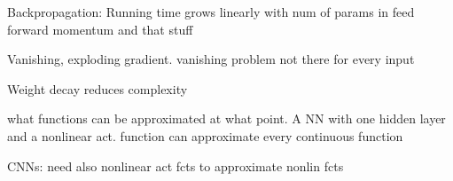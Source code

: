 Backpropagation: Running time grows linearly with num of params in feed forward
momentum and that stuff


Vanishing, exploding gradient. vanishing problem not there for every input

Weight decay reduces complexity

what functions can be approximated at what point. A NN with one hidden layer and a nonlinear act. function can approximate every continuous function

CNNs: need also nonlinear act fcts to approximate nonlin fcts